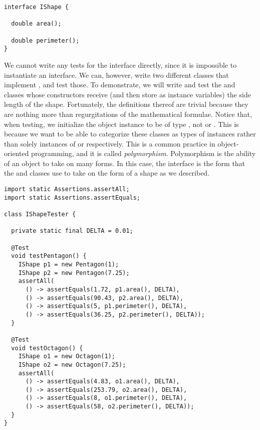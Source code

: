 \begin{lstlisting}[language=MyJava]
interface IShape {

  double area();

  double perimeter();
}
\end{lstlisting}

We cannot write any tests for the  interface directly, since it is impossible to instantiate an interface. We can, however, write two different classes that implement , and test those. To demonstrate, we will write and test the  and  classes whose constructors receive (and then store as instance variables) the side length of the shape. Fortunately, the definitions thereof are trivial because they are nothing more than regurgitations of the mathematical formulae. Notice that, when testing, we initialize the object instance to be of type , not  or . This is because we want to be able to categorize these classes as types of  instances rather than solely instances of  or  respectively. This is a common practice in object-oriented programming, and it is called \emph{polymorphism}. Polymorphism is the ability of an object to take on many forms. In this case, the  interface is the form that the  and  classes use to take on the form of a shape as we described.

\begin{lstlisting}[language=MyJava]
import static Assertions.assertAll;
import static Assertions.assertEquals;

class IShapeTester {

  private static final DELTA = 0.01;
  
  @Test
  void testPentagon() {
    IShape p1 = new Pentagon(1);
    IShape p2 = new Pentagon(7.25);
    assertAll(
      () -> assertEquals(1.72, p1.area(), DELTA),
      () -> assertEquals(90.43, p2.area(), DELTA),
      () -> assertEquals(5, p1.perimeter(), DELTA),
      () -> assertEquals(36.25, p2.perimeter(), DELTA));
  }

  @Test
  void testOctagon() {
    IShape o1 = new Octagon(1);
    IShape o2 = new Octagon(7.25);
    assertAll(
      () -> assertEquals(4.83, o1.area(), DELTA),
      () -> assertEquals(253.79, o2.area(), DELTA),
      () -> assertEquals(8, o1.perimeter(), DELTA),
      () -> assertEquals(58, o2.perimeter(), DELTA));
  }
}
\end{lstlisting}

